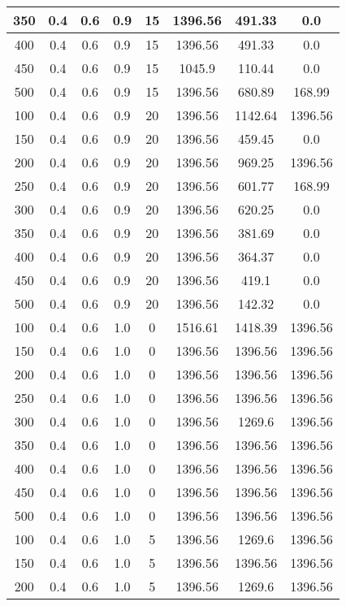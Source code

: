 \documentclass[a4paper, 12pt]{extreport}
\begin{document}
\begin{itemize}
\begin{longtable}{|c|c|c|c|c|c|c|c|}
			350 & 0.4 & 0.6 & 0.9 & 15 & 1396.56 & 491.33 & 0.0 \\\hline
			400 & 0.4 & 0.6 & 0.9 & 15 & 1396.56 & 491.33 & 0.0 \\\hline
			450 & 0.4 & 0.6 & 0.9 & 15 & 1045.9 & 110.44 & 0.0 \\\hline
			500 & 0.4 & 0.6 & 0.9 & 15 & 1396.56 & 680.89 & 168.99 \\\hline
			100 & 0.4 & 0.6 & 0.9 & 20 & 1396.56 & 1142.64 & 1396.56 \\\hline
			150 & 0.4 & 0.6 & 0.9 & 20 & 1396.56 & 459.45 & 0.0 \\\hline
			200 & 0.4 & 0.6 & 0.9 & 20 & 1396.56 & 969.25 & 1396.56 \\\hline
			250 & 0.4 & 0.6 & 0.9 & 20 & 1396.56 & 601.77 & 168.99 \\\hline
			300 & 0.4 & 0.6 & 0.9 & 20 & 1396.56 & 620.25 & 0.0 \\\hline
			350 & 0.4 & 0.6 & 0.9 & 20 & 1396.56 & 381.69 & 0.0 \\\hline
			400 & 0.4 & 0.6 & 0.9 & 20 & 1396.56 & 364.37 & 0.0 \\\hline
			450 & 0.4 & 0.6 & 0.9 & 20 & 1396.56 & 419.1 & 0.0 \\\hline
			500 & 0.4 & 0.6 & 0.9 & 20 & 1396.56 & 142.32 & 0.0 \\\hline
			100 & 0.4 & 0.6 & 1.0 & 0 & 1516.61 & 1418.39 & 1396.56 \\\hline
			150 & 0.4 & 0.6 & 1.0 & 0 & 1396.56 & 1396.56 & 1396.56 \\\hline
			200 & 0.4 & 0.6 & 1.0 & 0 & 1396.56 & 1396.56 & 1396.56 \\\hline
			250 & 0.4 & 0.6 & 1.0 & 0 & 1396.56 & 1396.56 & 1396.56 \\\hline
			300 & 0.4 & 0.6 & 1.0 & 0 & 1396.56 & 1269.6 & 1396.56 \\\hline
			350 & 0.4 & 0.6 & 1.0 & 0 & 1396.56 & 1396.56 & 1396.56 \\\hline
			400 & 0.4 & 0.6 & 1.0 & 0 & 1396.56 & 1396.56 & 1396.56 \\\hline
			450 & 0.4 & 0.6 & 1.0 & 0 & 1396.56 & 1396.56 & 1396.56 \\\hline
			500 & 0.4 & 0.6 & 1.0 & 0 & 1396.56 & 1396.56 & 1396.56 \\\hline
			100 & 0.4 & 0.6 & 1.0 & 5 & 1396.56 & 1269.6 & 1396.56 \\\hline
			150 & 0.4 & 0.6 & 1.0 & 5 & 1396.56 & 1396.56 & 1396.56 \\\hline
			200 & 0.4 & 0.6 & 1.0 & 5 & 1396.56 & 1269.6 & 1396.56 \\\hline

\end{longtable}
\end{itemize}
\end{document}

